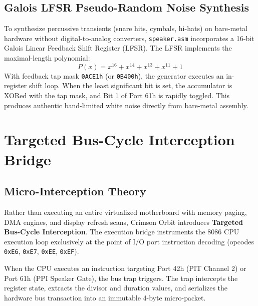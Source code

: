 \documentclass[conference]{IEEEtran}
\begin{document}
\subsection{Galois LFSR Pseudo-Random Noise Synthesis}
To synthesize percussive transients (snare hits, cymbals, hi-hats) on bare-metal hardware without digital-to-analog converters, \texttt{speaker.asm} incorporates a 16-bit Galois Linear Feedback Shift Register (LFSR). The LFSR implements the maximal-length polynomial:
\begin{equation}
P(x) = x^{16} + x^{14} + x^{13} + x^{11} + 1
\end{equation}
With feedback tap mask \texttt{0ACE1h} (or \texttt{0B400h}), the generator executes an in-register shift loop. When the least significant bit is set, the accumulator is XORed with the tap mask, and Bit 1 of Port 61h is rapidly toggled. This produces authentic band-limited white noise directly from bare-metal assembly.

\section{Targeted Bus-Cycle Interception Bridge}

\subsection{Micro-Interception Theory}
Rather than executing an entire virtualized motherboard with memory paging, DMA engines, and display refresh scans, Crimson Orbit introduces \textbf{Targeted Bus-Cycle Interception}. The execution bridge instruments the 8086 CPU execution loop exclusively at the point of I/O port instruction decoding (opcodes \texttt{0xE6}, \texttt{0xE7}, \texttt{0xEE}, \texttt{0xEF}).

When the CPU executes an instruction targeting Port 42h (PIT Channel 2) or Port 61h (PPI Speaker Gate), the bus trap triggers. The trap intercepts the register state, extracts the divisor and duration values, and serializes the hardware bus transaction into an immutable 4-byte micro-packet.
\end{document}
